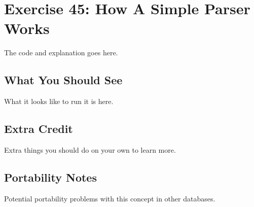 \chapter{Exercise 45: How A Simple Parser Works}


The code and explanation goes here.

\section{What You Should See}

What it looks like to run it is here.

\section{Extra Credit}

Extra things you should do on your own to learn more.

\section{Portability Notes}

Potential portability problems with this concept in other databases.

